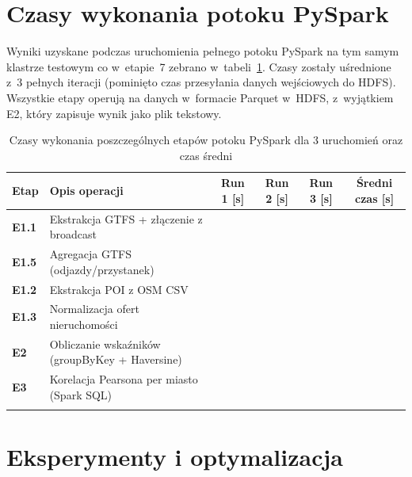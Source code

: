 \documentclass{labreport}
\begin{document}
\newpage
\section{Czasy wykonania potoku PySpark}

Wyniki uzyskane podczas uruchomienia pełnego potoku PySpark na tym samym klastrze testowym co w~etapie~7 zebrano w~tabeli~\ref{tab:spark_run_times}. Czasy zostały uśrednione z~3 pełnych iteracji (pominięto czas przesyłania danych wejściowych do HDFS). Wszystkie etapy operują na danych w~formacie Parquet w~HDFS, z~wyjątkiem E2, który zapisuje wynik jako plik tekstowy.

\begin{table}[H]
\centering
\caption{Czasy wykonania poszczególnych etapów potoku PySpark dla 3 uruchomień oraz czas średni}
\label{tab:spark_run_times}
\renewcommand{\arraystretch}{1.3}
\begin{tabular}{|l|p{5.5cm}|c|c|c|c|}
\hline
\rowcolor{gray!20}
\textbf{Etap} & \textbf{Opis operacji} & \textbf{Run 1 [s]} & \textbf{Run 2 [s]} & \textbf{Run 3 [s]} & \textbf{Średni czas [s]} \\ \hline
\textbf{E1.1} & Ekstrakcja GTFS + złączenie z broadcast & & & & \\ \hline
\textbf{E1.5} & Agregacja GTFS (odjazdy/przystanek) & & & & \\ \hline
\textbf{E1.2} & Ekstrakcja POI z OSM CSV & & & & \\ \hline
\textbf{E1.3} & Normalizacja ofert nieruchomości & & & & \\ \hline
\textbf{E2} & Obliczanie wskaźników (groupByKey + Haversine) & & & & \\ \hline
\textbf{E3} & Korelacja Pearsona per miasto (Spark SQL) & & & & \\ \hline
\rowcolor{gray!10}
\multicolumn{5}{|r|}{\textbf{Łączny średni czas wykonania}} & \\ \hline
\end{tabular}
\end{table}

\section{Eksperymenty i optymalizacja}
\end{document}
